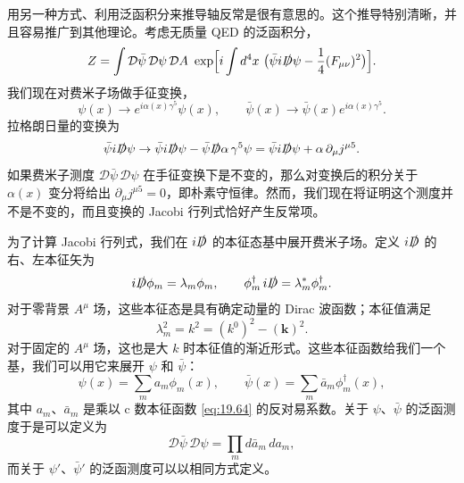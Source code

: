 用另一种方式、利用泛函积分来推导轴反常是很有意思的。这个推导特别清晰，并且容易推广到其他理论。考虑无质量 QED 的泛函积分，
\begin{equation}
  Z = \int \mathcal{D}\bar{\psi}\,\mathcal{D}\psi\,\mathcal{D}A\ \exp\Bigl[
    i\int d^4x\ \bigl( \bar{\psi}i\slashed{D}\psi
      - \frac{1}{4}(F_{\mu\nu})^2 \bigr) \Bigr] .
  \label{eq:19.61}
\end{equation}
我们现在对费米子场做手征变换，
\begin{equation}
  \psi(x) \to e^{i\alpha(x)\gamma^5}\psi(x),\qquad
  \bar{\psi}(x) \to \bar{\psi}(x)e^{i\alpha(x)\gamma^5} .
  \label{eq:19.62}
\end{equation}
拉格朗日量的变换为
\begin{equation}
  \bar{\psi}i\slashed{D}\psi \to \bar{\psi}i\slashed{D}\psi
    - \bar{\psi}\slashed{D}\alpha\,\gamma^5\psi
    = \bar{\psi}i\slashed{D}\psi + \alpha\,\partial_\mu j^{\mu 5} .
  \label{eq:19.63}
\end{equation}
如果费米子测度 $\mathcal{D}\bar{\psi}\,\mathcal{D}\psi$ 在手征变换下是不变的，那么对变换后的积分关于 $\alpha(x)$ 变分将给出 $\partial_\mu j^{\mu 5} = 0$，即朴素守恒律。然而，我们现在将证明这个测度并不是不变的，而且变换的 Jacobi 行列式恰好产生反常项。

为了计算 Jacobi 行列式，我们在 $i\slashed{D}$ 的本征态基中展开费米子场。定义 $i\slashed{D}$ 的右、左本征矢为
\begin{equation}
  i\slashed{D}\phi_m = \lambda_m\phi_m,\qquad
  \phi^{\dagger}_m\,i\slashed{D} = \lambda^{*}_m\phi^{\dagger}_m .
  \label{eq:19.64}
\end{equation}
对于零背景 $A^\mu$ 场，这些本征态是具有确定动量的 Dirac 波函数；本征值满足
\begin{equation}
  \lambda^2_m = k^2 = (k^0)^2 - (\mathbf{k})^2 .
  \label{eq:19.65}
\end{equation}
对于固定的 $A^\mu$ 场，这也是大 $k$ 时本征值的渐近形式。这些本征函数给我们一个基，我们可以用它来展开 $\psi$ 和 $\bar{\psi}$：
\begin{equation}
  \psi(x) = \sum_m a_m\phi_m(x),\qquad
  \bar{\psi}(x) = \sum_m \bar{a}_m\phi^{\dagger}_m(x) ,
  \label{eq:19.66}
\end{equation}
其中 $a_m$、$\bar{a}_m$ 是乘以 c 数本征函数 \eqref{eq:19.64} 的反对易系数。关于 $\psi$、$\bar{\psi}$ 的泛函测度于是可以定义为
\begin{equation}
  \mathcal{D}\bar{\psi}\,\mathcal{D}\psi = \prod_m d\bar{a}_m\,da_m ,
  \label{eq:19.67}
\end{equation}
而关于 $\psi'$、$\bar{\psi}'$ 的泛函测度可以以相同方式定义。

